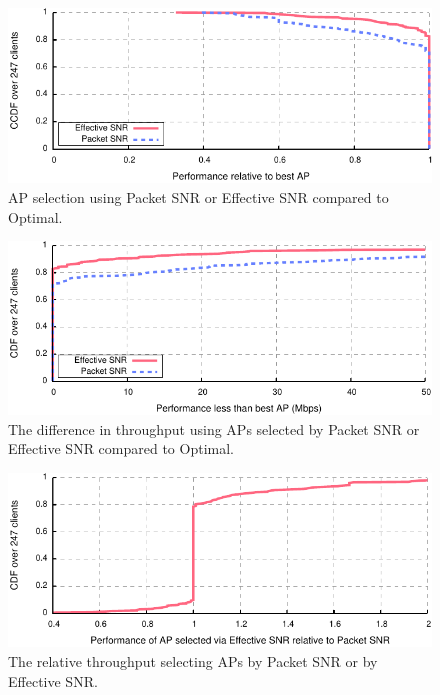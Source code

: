 \begin{figure}[p]
	\centering
	\includegraphics[width=\textwidth]{figures/applications/ap_sel_ratio_opt.pdf}
	\caption[AP selection using Packet SNR or Effective SNR compared to Optimal]{\label{fig:ap_sel_ratio_opt}AP selection using Packet SNR or Effective SNR compared to Optimal.}
\end{figure}

\begin{figure}[p]
	\centering
	\includegraphics[width=\textwidth]{figures/applications/ap_sel_diff_opt.pdf}
	\caption[Throughput difference using APs selected by Packet SNR or Effective SNR]{\label{fig:ap_sel_delta_opt}The difference in throughput using APs selected by Packet SNR or Effective SNR compared to Optimal.}
\end{figure}

\begin{figure}[p]
	\centering
	\includegraphics[width=\textwidth]{figures/applications/ap_sel_ratio.pdf}
	\caption[The relative throughput selecting APs by Packet SNR or by Effective SNR]{\label{fig:ap_sel_ratio}The relative throughput selecting APs by Packet SNR or by Effective SNR.}
\end{figure}

